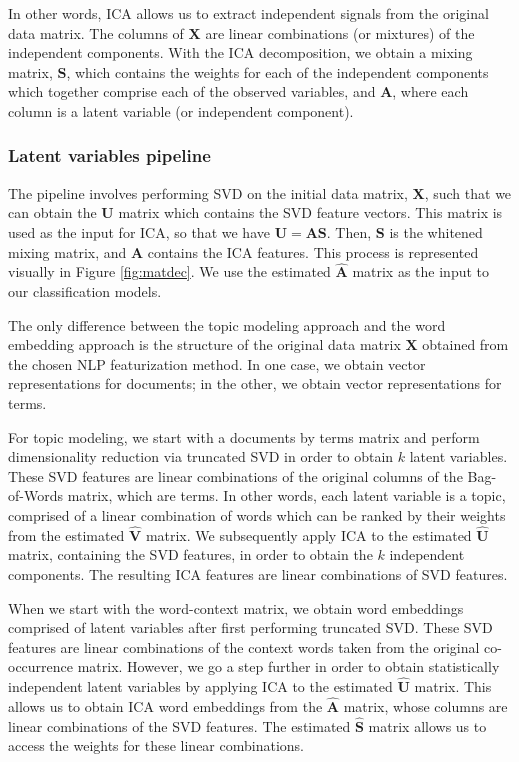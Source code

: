 \documentclass{article}
\begin{document}
In other words, ICA allows us to extract independent signals from the
original data matrix. The columns of \(\mathbf{X}\) are linear
combinations (or mixtures) of the independent components. With the ICA
decomposition, we obtain a mixing matrix, \(\mathbf{S}\), which contains
the weights for each of the independent components which together
comprise each of the observed variables, and \(\mathbf{A}\), where each
column is a latent variable (or independent component).

\hypertarget{latent-variables-pipeline}{%
\subsubsection{Latent variables
pipeline}\label{latent-variables-pipeline}}

\label{sec:LVpipe} The pipeline involves performing SVD on the initial
data matrix, \(\mathbf{X}\), such that we can obtain the \(\mathbf{U}\)
matrix which contains the SVD feature vectors. This matrix is used as
the input for ICA, so that we have \(\mathbf{U = AS}\). Then,
\(\mathbf{S}\) is the whitened mixing matrix, and \(\mathbf{A}\)
contains the ICA features. This process is represented visually in
Figure \ref{fig:matdec}. We use the estimated \(\mathbf{\hat{A}}\)
matrix as the input to our classification models.

The only difference between the topic modeling approach and the word
embedding approach is the structure of the original data matrix
\(\mathbf{X}\) obtained from the chosen NLP featurization method. In one
case, we obtain vector representations for documents; in the other, we
obtain vector representations for terms.

For topic modeling, we start with a documents by terms matrix and
perform dimensionality reduction via truncated SVD in order to obtain
\(k\) latent variables. These SVD features are linear combinations of
the original columns of the Bag-of-Words matrix, which are terms. In
other words, each latent variable is a topic, comprised of a linear
combination of words which can be ranked by their weights from the
estimated \(\mathbf{\hat{V}}\) matrix. We subsequently apply ICA to the
estimated \(\mathbf{\hat{U}}\) matrix, containing the SVD features, in
order to obtain the \(k\) independent components. The resulting ICA
features are linear combinations of SVD features.

When we start with the word-context matrix, we obtain word embeddings
comprised of latent variables after first performing truncated SVD.
These SVD features are linear combinations of the context words taken
from the original co-occurrence matrix. However, we go a step further in
order to obtain statistically independent latent variables by applying
ICA to the estimated \(\mathbf{\hat{U}}\) matrix. This allows us to
obtain ICA word embeddings from the \(\mathbf{\hat{A}}\) matrix, whose
columns are linear combinations of the SVD features. The estimated
\(\mathbf{\hat{S}}\) matrix allows us to access the weights for these
linear combinations.
\end{document}
